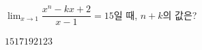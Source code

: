 $\displaystyle\lim_{x\to 1}\dfrac{x^n-kx+2}{x-1}=15$일 때, $n+k$의 값은? 
\begin{choices32}{$15$}{$17$}{$19$}{$21$}{$23$}\end{choices32}
